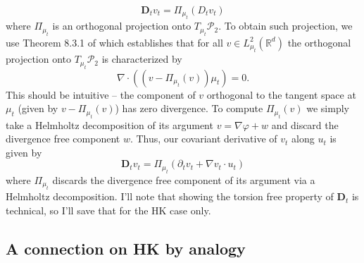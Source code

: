 \documentclass{article}
\begin{document}
\begin{equation}
    \mathbf{D}_tv_t = \Pi_{\mu_t}\left(D_tv_t\right)
\end{equation}
where $\Pi_{\mu_t}$ is an orthogonal projection onto $T_{\mu_t}\mathcal{P}_2$. To obtain such projection, we use Theorem 8.3.1 of \citet{ambrosio2007gradient} which establishes that for all $v \in L^{2}_{\mu_t}(\mathbb{R}^d)$ the orthogonal projection onto $T_{\mu_t}\mathcal{P}_2$ is characterized by
\begin{equation}
    \nabla \cdot ((v - \Pi_{\mu_t}(v))\mu_t) = 0.
\end{equation}
This should be intuitive -- the component of $v$ orthogonal to the tangent space at $\mu_t$ (given by $v - \Pi_{\mu_t}(v)$) has zero divergence. To compute $\Pi_{\mu_t}(v)$ we simply take a Helmholtz decomposition of its argument $v = \nabla \varphi + w$ and discard the divergence free component $w$. Thus, our covariant derivative of $v_t$ along $u_t$ is given by 
\begin{equation}
    \mathbf{D}_tv_t = \Pi_{\mu_t}\left(\partial_tv_t + \nabla v_t \cdot u_t\right)
\end{equation}
where $\Pi_{\mu_t}$ discards the divergence free component of its argument via a Helmholtz decomposition. I'll note that showing the torsion free property of $\mathbf{D}_t$ is technical, so I'll save that for the HK case only. 

\subsection{A connection on HK by analogy}
\end{document}
